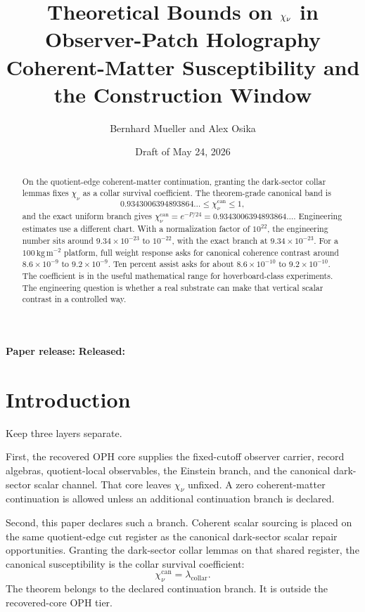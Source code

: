 \documentclass[11pt]{article}
\title{\textbf{Theoretical Bounds on \(\chinu\) in Observer-Patch Holography}\\
\large Coherent-Matter Susceptibility and the Construction Window}
\author{Bernhard Mueller and Alex Osika}
\date{Draft of May 24, 2026}
\numberwithin{equation}{section}
\theoremstyle{remark}
\newcommand{\chinu}{\chi_\nu}
\newcommand{\chican}{\chi_\nu^{\mathrm{can}}}
\newcommand{\lambdac}{\lambda_{\mathrm{collar}}}
\begin{document}
\maketitle
\begin{center}
\small\textbf{Paper release:} \OPHPaperReleaseID\quad
\textbf{Released:} \OPHPaperReleaseDate
\end{center}

\begin{abstract}
On the quotient-edge coherent-matter continuation, granting the dark-sector
collar lemmas fixes \(\chinu\) as a collar survival coefficient. The
theorem-grade canonical band is
\[
0.9343006394893864\ldots\le\chican\le1,
\]
and the exact uniform branch gives
\(\chican=e^{-P/24}=0.9343006394893864\ldots\). Engineering estimates use a
different chart. With a normalization factor of \(10^{22}\), the engineering
number sits around \(9.34\times10^{-23}\) to \(10^{-22}\), with the exact branch
at \(9.34\times10^{-23}\). For a \(100\,\mathrm{kg\,m^{-2}}\) platform, full
weight response asks for canonical coherence contrast around \(8.6\times10^{-9}\)
to \(9.2\times10^{-9}\). Ten percent assist asks for about \(8.6\times10^{-10}\)
to \(9.2\times10^{-10}\). The coefficient is in the useful mathematical range
for hoverboard-class experiments. The engineering question is whether a real
substrate can make that vertical scalar contrast in a controlled way.
\end{abstract}

\tableofcontents

\section{Introduction}

Keep three layers separate.

First, the recovered OPH core supplies the fixed-cutoff observer carrier, record
algebras, quotient-local observables, the Einstein branch, and the canonical
dark-sector scalar channel. That core leaves \(\chinu\) unfixed. A zero
coherent-matter continuation is allowed unless an additional continuation branch
is declared.

Second, this paper declares such a branch. Coherent scalar sourcing is placed on
the same quotient-edge cut register as the canonical dark-sector scalar repair
opportunities. Granting the dark-sector collar lemmas on that shared register,
the canonical susceptibility is the collar survival coefficient:
\[
\chican=\lambdac.
\]
The theorem belongs to the declared continuation branch. It is outside the
recovered-core OPH tier.
\end{document}
